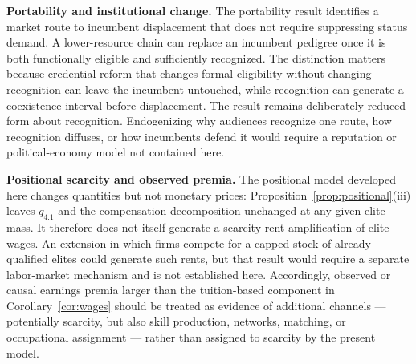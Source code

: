 \documentclass[12pt,letterpaper]{article}
\theoremstyle{definition}
\begin{document}
\textbf{Portability and institutional change.}
The portability result identifies a market route to incumbent displacement that does not
require suppressing status demand.
A lower-resource chain can replace an incumbent pedigree once it is both functionally
eligible and sufficiently recognized.
The distinction matters because credential reform that changes formal eligibility without
changing recognition can leave the incumbent untouched, while recognition can generate a
coexistence interval before displacement.
The result remains deliberately reduced form about recognition.
Endogenizing why audiences recognize one route, how recognition diffuses, or how
incumbents defend it would require a reputation or political-economy model not contained
here.

\textbf{Positional scarcity and observed premia.}
The positional model developed here changes quantities but not monetary prices: Proposition~\ref{prop:positional}(iii) leaves $q_{4.1}$ and the compensation decomposition unchanged at any given elite mass.
It therefore does not itself generate a scarcity-rent amplification of elite wages.
An extension in which firms compete for a capped stock of already-qualified elites could generate such rents, but that result would require a separate labor-market mechanism and is not established here.
Accordingly, observed or causal earnings premia larger than the tuition-based component in Corollary~\ref{cor:wages} should be treated as evidence of additional channels --- potentially scarcity, but also skill production, networks, matching, or occupational assignment --- rather than assigned to scarcity by the present model.
\end{document}
